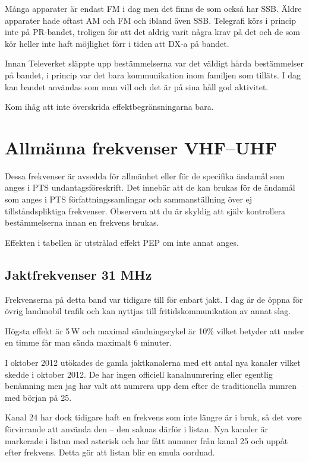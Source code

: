 Många apparater är endast FM i dag men det finns de som också har SSB. Äldre
apparater hade oftast AM och FM och ibland även SSB. Telegrafi körs i princip
inte på PR-bandet, troligen för att det aldrig varit några krav på det och de
som kör heller inte haft möjlighet förr i tiden att DX-a på bandet.

Innan Televerket släppte upp bestämmelserna var det väldigt hårda bestämmelser
på bandet, i princip var det bara kommunikation inom familjen som tilläts. I dag
kan bandet användas som man vill och det är på sina håll god aktivitet.

Kom ihåg att inte överskrida effektbegränsningarna bara.

\clearpage

\section{Allmänna frekvenser VHF--UHF}

Dessa frekvenser är avsedda för allmänhet eller för de specifika ända\-mål som
anges i PTS undantagsföreskrift. Det innebär att de kan brukas för de ändamål
som anges i PTS för\-fatt\-nings\-sam\-ling\-ar och sammanställning över ej
tillståndspliktiga frekvenser. Observera att du är skyldig att själv
kontrollera bestämmelserna innan en frekvens brukas.

Effekten i tabellen är utstrålad effekt PEP om inte annat anges.

\subsection{Jaktfrekvenser 31 MHz}

Frekvenserna på detta band var tidigare till för enbart jakt. I dag är de
öppna för övrig landmobil trafik och kan nyttjas till fritidskommunikation av
annat slag.

Högsta effekt är 5\,W och maximal sändningscykel är 10\% vilket betyder att
under en timme får man sända maximalt 6 minuter.

I oktober 2012 utökades de gamla jaktkanalerna med ett antal nya kanaler
vilket skedde i oktober 2012. De har ingen officiell kanalnumrering eller
egentlig benämning men jag har valt att numrera upp dem efter de traditionella
numren med början på 25.

Kanal 24 har dock tidigare haft en frekvens som inte längre är i bruk, så det
vore förvirrande att använda den -- den saknas därför i listan. Nya kanaler är
markerade i listan med asterisk och har fått nummer från kanal 25 och uppåt
efter frekvens. Detta gör att listan blir en smula oordnad.

